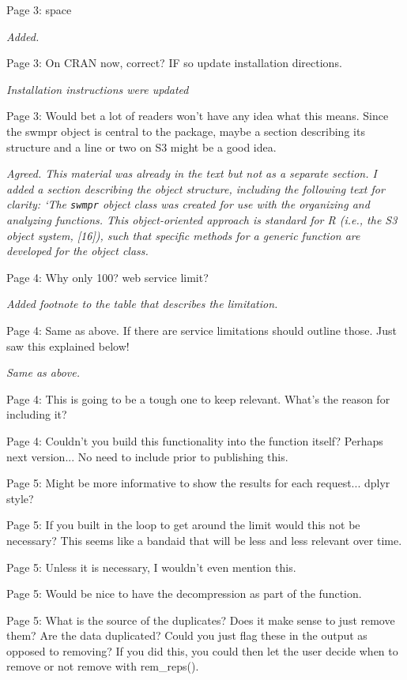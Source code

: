 \documentclass[letterpaper,12pt]{article}\usepackage[]{graphicx}\usepackage[]{color}
\begin{document}
Page 3: space

{\it Added.}

Page 3: On CRAN now, correct? IF so update installation directions.

{\it Installation instructions were updated}
 
Page 3: Would bet a lot of readers won't have any idea what this means. Since the swmpr object is central to the package, maybe a section describing its structure and a line or two on S3 might be a good idea.

{\it Agreed.  This material was already in the text but not as a separate section.  I added a section describing the object structure, including the following text for clarity: `The \texttt{swmpr} object class was created for use with the organizing and analyzing functions.  This object-oriented approach is standard for R (i.e., the S3 object  system, [16]), such that specific methods for a generic function are developed for the object class.}  

Page 4: Why only 100? web service limit?

{\it Added footnote to the table that describes the limitation.}

Page 4: Same as above. If there are service limitations should outline those. Just saw this explained below!

{\it Same as above.}

Page 4: This is going to be a tough one to keep relevant. What's the reason for including it?

Page 4: Couldn't you build this functionality into the function itself? Perhaps next version... No need to include prior to publishing this.

Page 5: Might be more informative to show the results for each request... dplyr style?

Page 5: If you built in the loop to get around the limit would this not be necessary? This seems like a bandaid that will be less and less relevant over time.

Page 5: Unless it is necessary, I wouldn't even mention this.

Page 5: Would be nice to have the decompression as part of the function.

Page 5: What is the source of the duplicates? Does it make sense to just remove them? Are the data duplicated? Could you just flag these in the output as opposed to removing? If you did this, you could then let the user decide when to remove or not remove with rem\_reps().
\end{document}
